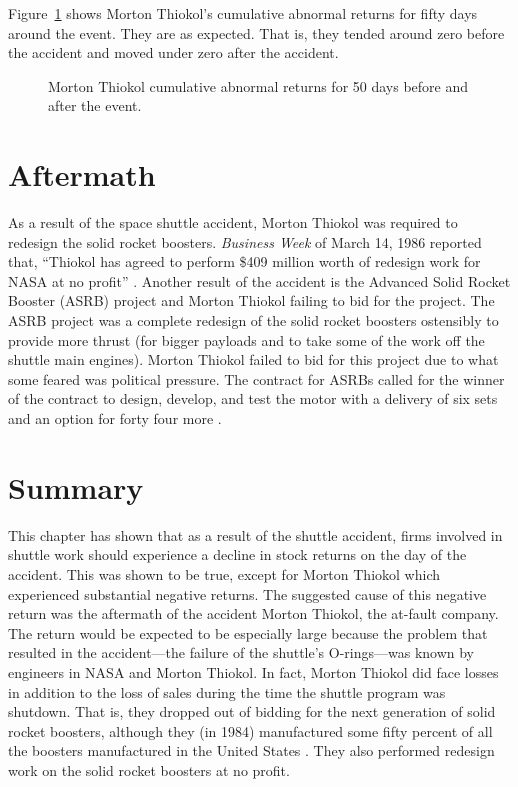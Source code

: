 Figure~\ref{thcar} shows Morton Thiokol's cumulative
abnormal returns for fifty days around the event.  They are
as expected.  That is, they tended around zero before the
accident and moved under zero after the accident.

\begin{figure}[hp]
\begin{center}

\end{center}
\caption{Morton Thiokol cumulative abnormal returns for 50
days before and after the event.}
\label{thcar}
\end{figure}
\clearpage



\section{Aftermath}

As a result of the space shuttle accident, Morton Thiokol
was required to redesign the solid rocket boosters.  {\em
Business Week} of March 14, 1986 reported that, ``Thiokol
has agreed to perform \$409 million worth of redesign work
for NASA at no profit'' \cite[p. 91]{bw}.
Another result of
the accident is the Advanced Solid Rocket Booster (ASRB) project and Morton
Thiokol failing to bid for the project.  The ASRB project
was a complete redesign of the solid rocket boosters
ostensibly to provide more thrust (for bigger payloads and
to take some of the work off the shuttle main engines). 
Morton Thiokol failed to bid for this project due to what
some feared was political pressure.
The contract for ASRBs called for the winner of the contract
to design, develop, and test the motor with a delivery of
six sets and an option for forty four more \cite[p.
13]{gao89}.

\section{Summary}

This chapter has shown that as a result of the shuttle
accident, firms involved in shuttle work should experience a
decline in stock returns on the day of the accident.  This
was shown to be true, except for Morton Thiokol which
experienced substantial negative returns.  The suggested
cause of this negative return was the aftermath of the
accident Morton Thiokol, the at-fault company.  The return
would be expected to be especially large because the problem
that resulted in the accident---the failure of the shuttle's
O-rings---was known by engineers in NASA and Morton Thiokol.
In fact, Morton Thiokol did face losses in addition to the
loss of sales during the time the shuttle program was
shutdown.  That is, they dropped out of bidding for the next
generation of solid rocket boosters, although they (in 1984)
manufactured some fifty percent of all the boosters
manufactured in the United States \cite[p. 18]{gao86}.  They also performed
redesign work on the solid rocket boosters at no profit.

